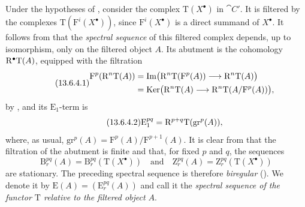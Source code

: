 \begin{env}[13.6.4]
\label{0.13.6.4}
Under the hypotheses of , consider the complex
$\mathrm{T}(X^\bullet)$ in $\cat{C}'$.
It is filtered by the complexes
$\mathrm{T}(\mathrm{F}^i(X^\bullet))$, since
$\mathrm{F}^i(X^\bullet)$ is a direct summand of $X^\bullet$.
It follows from  that the \emph{spectral sequence} of
this filtered complex depends, up to isomorphism, only on the
filtered object $A$.
Its abutment is the cohomology $\mathrm{R}^\bullet\mathrm{T}(A)$, equipped
with the filtration
\begin{equation}
\label{0.13.6.4.1}
\tag{13.6.4.1}
  \begin{split}
  \mathrm{F}^p(\mathrm{R}^n\mathrm{T}(A))
  &=
  \operatorname{Im}\bigl(
    \mathrm{R}^n\mathrm{T}(\mathrm{F}^p(A))
    \longrightarrow
    \mathrm{R}^n\mathrm{T}(A)
  \bigr)
  \\
  &=
  \operatorname{Ker}\bigl(
    \mathrm{R}^n\mathrm{T}(A)
    \longrightarrow
    \mathrm{R}^n\mathrm{T}(A/\mathrm{F}^p(A))
  \bigr),
  \end{split}
\end{equation}
by , and its $\mathrm{E}_1$-term is
\begin{equation}
\label{0.13.6.4.2}
\tag{13.6.4.2}
  \mathrm{E}_1^{pq}
  =
  \mathrm{R}^{p+q}\mathrm{T}(\mathrm{gr}^p(A)),
\end{equation}
where, as usual,
$\mathrm{gr}^p(A)=\mathrm{F}^p(A)/\mathrm{F}^{p+1}(A)$.
It is clear from  that the filtration of the abutment
is finite and that, for fixed $p$ and $q$, the sequences
\[
  \mathrm{B}_r^{pq}(A)
  =
  \mathrm{B}_r^{pq}(\mathrm{T}(X^\bullet))
  \quad\text{and}\quad
  \mathrm{Z}_r^{pq}(A)
  =
  \mathrm{Z}_r^{pq}(\mathrm{T}(X^\bullet))
\]
are stationary.
The preceding spectral sequence is therefore \emph{biregular}
().
We denote it by
$\mathrm{E}(A)=(\mathrm{E}_r^{pq}(A))$ and call it the
\emph{spectral sequence of the functor $\mathrm{T}$ relative to the
filtered object $A$}.
\end{env}

